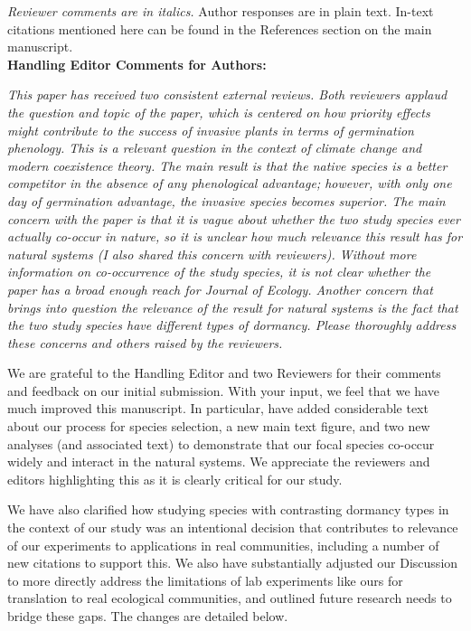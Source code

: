 \documentclass[11pt]{article}
\begin{document}
\emph{Reviewer comments are in italics.} Author responses are in plain text. In-text citations mentioned here can be found in the References section on the main manuscript.\\

\textbf{Handling Editor Comments for Authors:}

\emph{This paper has received two consistent external reviews. Both reviewers applaud the question and topic of the paper, which is centered on how priority effects might contribute to the success of invasive plants in terms of germination phenology. This is a relevant question in the context of climate change and modern coexistence theory. The main result is that the native species is a better competitor in the absence of any phenological advantage; however, with only one day of germination advantage, the invasive species becomes superior. The main concern with the paper is that it is vague about whether the two study species ever actually co-occur in nature, so it is unclear how much relevance this result has for natural systems (I also shared this concern with reviewers). Without more information on co-occurrence of the study species, it is not clear whether the paper has a broad enough reach for Journal of Ecology. Another concern that brings into question the relevance of the result for natural systems is the fact that the two study species have different types of dormancy. Please thoroughly address these concerns and others raised by the reviewers. }

We are grateful to the Handling Editor and two Reviewers for their comments and feedback on our initial submission. With your input, we feel that we have much improved this manuscript. In particular, have added considerable text about our process for species selection, a new main text figure, and two new analyses (and associated text) to demonstrate that our focal species co-occur widely and interact in the natural systems. We appreciate the reviewers and editors highlighting this as it is clearly critical for our study. %

We have also clarified how studying species with contrasting dormancy types in the context of our study was an intentional decision that contributes to relevance of our experiments to applications in real communities, including a number of new citations to support this. We also have substantially adjusted our Discussion to more directly address the limitations of lab experiments like ours for translation to real ecological communities, and outlined future research needs to bridge these gaps. The changes are detailed below.
\end{document}
